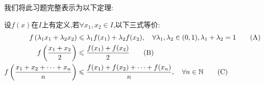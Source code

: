 我们将此习题完整表示为以下定理:
\begin{theorem*}
    设$f(x)$在$I$上有定义,若$\forall x_1,x_2 \in I$,以下三式等价:
    \begin{align}
        f\left(\lambda_1 x_1 + \lambda_2 x_2\right) & \leqslant \lambda_1 f(x_1) + \lambda_2 f(x_2) , \quad \forall \lambda_1,\lambda_2 \in (0,1) , \lambda_1+\lambda_2 = 1 \tag{A} \\
        f\left( \frac{x_1+x_2}2 \right)             & \leqslant \frac{f(x_1)+f(x_2)}2 \tag{B}                                                                                       \\
        f\left( \frac{x_1+x_2+\cdots+x_n}n \right)  & \leqslant \frac{f(x_1)+f(x_2)+\cdots+f(x_n)}n , \quad \forall n \in \mathbb{N} \tag{C}
    \end{align}
\end{theorem*}
